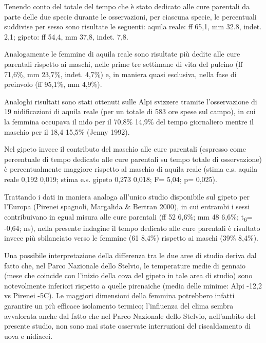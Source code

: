 Tenendo conto del totale del tempo che \`e stato dedicato alle cure
parentali da parte delle due specie durante le osservazioni, per
ciascuna specie, le percentuali suddivise per sesso sono risultate le
seguenti: aquila reale: ff 65,1, mm 32.8, indet. 2,1; gipeto: ff 54,4,
mm 37,8, indet. 7,8.

Analogamente le femmine di aquila reale sono risultate pi\`u dedite alle
cure parentali rispetto ai maschi, nelle prime tre settimane di vita
del pulcino (ff 71,6\%, mm 23,7\%, indet. 4,7\%) e, in maniera quasi
esclusiva, nella fase di preinvolo (ff 95,1\%, mm 4,9\%). 

Analoghi risultati sono stati ottenuti sulle Alpi svizzere tramite
l{\textquoteright}osservazione di 19 nidificazioni di aquila reale (per
un totale di 583 ore spese sul campo), in cui la femmina occupava il
nido per il 70,8\% {\textpm} 14,9\% del tempo giornaliero mentre il
maschio per il 18,4 {\textpm} 15,5\% (Jenny 1992).

Nel gipeto invece il contributo del maschio alle cure parentali
(espresso come percentuale di tempo dedicato alle cure parentali su
tempo totale di osservazione) \`e percentualmente maggiore rispetto al
maschio di aquila reale (stima {\textpm} e.s. aquila reale 0,192
{\textpm} 0,019; stima {\textpm} e.s. gipeto 0,273 {\textpm} 0,018; F=
5,04; p= 0,025). 

Trattando i dati in maniera analoga all{\textquoteright}unico studio
disponibile sul gipeto per l{\textquoteright}Europa (Pirenei spagnoli,
Margalida \& Bertran 2000), in cui entrambi i sessi contribuivano in
egual misura alle cure parentali (ff 52 {\textpm} 6,6\%; mm 48
{\textpm} 6,6\%; t\textsubscript{6}= -0,64; ns), nella presente
indagine il tempo dedicato alle cure parentali \`e risultato invece
pi\`u sbilanciato verso le femmine (61 {\textpm} 8,4\%) rispetto ai
maschi (39\% {\textpm} 8,4\%).

Una possibile interpretazione della differenza tra le due aree di studio
deriva dal fatto che, nel Parco Nazionale dello Stelvio, le temperature
medie di gennaio (mese che coincide con l{\textquoteright}inizio della
cova del gipeto in tale area di studio) sono notevolmente inferiori
rispetto a quelle pirenaiche (media delle minime: Alpi -12,2 vs Pirenei
-5{\textdegree}C). Le maggiori dimensioni della femmina potrebbero
infatti garantire un pi\`u efficace isolamento termico;
l{\textquoteright}influenza del clima sembra avvalorata anche dal fatto
che nel Parco Nazionale dello Stelvio, nell{\textquoteright}ambito del
presente studio, non sono mai state osservate interruzioni del
riscaldamento di uova e nidiacei. 

